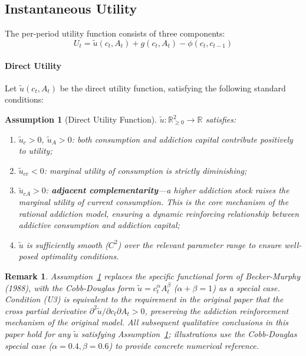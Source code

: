 \documentclass[12pt]{article}
\newtheorem{remark}{Remark}
\newtheorem{assumption}{Assumption}
\begin{document}
\subsection{Instantaneous Utility}
 
The per-period utility function consists of three components:
\begin{equation}
    U_t = \tilde{u}(c_t, A_t) + g(c_t, A_t) - \phi(c_t, c_{t-1})
    \label{eq:utility}
\end{equation}
 

\paragraph{Direct Utility}
 
Let $\tilde{u}(c_t, A_t)$ be the direct utility function, satisfying the following standard conditions:
 
\begin{assumption}[Direct Utility Function]\label{ass:utility}
$\tilde{u}: \mathbb{R}_{\geq 0}^2 \to \mathbb{R}$ satisfies:
\begin{enumerate}
    \item[(U1)] $\tilde{u}_c > 0,\ \tilde{u}_A > 0$: both consumption and addiction capital contribute positively to utility;
    \item[(U2)] $\tilde{u}_{cc} < 0$: marginal utility of consumption is strictly diminishing;
    \item[(U3)] $\tilde{u}_{cA} > 0$: \textbf{adjacent complementarity}---a higher addiction stock
        raises the marginal utility of current consumption. This is the core mechanism of the rational addiction model, ensuring a dynamic reinforcing relationship
        between addictive consumption and addiction capital\cite{BeckerMurphy1988};
    \item[(U4)] $\tilde{u}$ is sufficiently smooth ($C^2$) over the relevant parameter range to ensure well-posed optimality conditions.
\end{enumerate}
\end{assumption}
 
\begin{remark}
Assumption~\ref{ass:utility} replaces the specific functional form of Becker-Murphy (1988),
with the Cobb-Douglas form $\tilde{u} = c_t^\alpha A_t^\beta$ ($\alpha + \beta = 1$)
as a special case. Condition (U3) is equivalent to the requirement in the original paper that the cross partial derivative
$\partial^2\tilde{u}/\partial c_t \partial A_t > 0$, preserving the addiction reinforcement mechanism of the original model.
All subsequent qualitative conclusions in this paper hold for any $\tilde{u}$ satisfying Assumption~\ref{ass:utility};
illustrations use the Cobb-Douglas special case ($\alpha = 0.4, \beta = 0.6$) to provide concrete numerical reference.
\end{remark}
\end{document}
